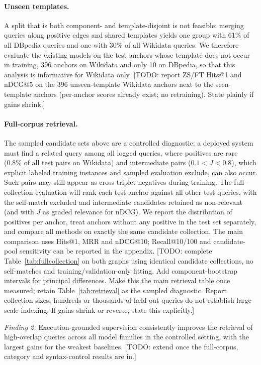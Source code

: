 \documentclass[runningheads]{llncs}
\newcommand{\hp}[1]{{\color{red!75!black}#1}}
\begin{document}
\paragraph{Unseen templates.}
A split that is both component- and template-disjoint is not feasible: merging
queries along positive edges and shared templates yields one group with 61\%
of all DBpedia queries and one with 30\% of all Wikidata queries. We therefore
evaluate the existing models on the test anchors whose template does not occur
in training, 396 anchors on Wikidata and only 10 on DBpedia, so that this
analysis is informative for Wikidata only.
\hp{[TODO: report ZS/FT Hits@1 and nDCG@5 on the 396 unseen-template Wikidata
anchors next to the seen-template anchors (per-anchor scores already exist; no
retraining). State plainly if gains shrink.]}

\paragraph{Full-corpus retrieval.}
The sampled candidate sets above are a controlled diagnostic; a deployed
system must find a related query among all logged queries, where positives are
rare (0.8\% of all test pairs on Wikidata) and intermediate pairs
($0.1 < J < 0.8$), which explicit labeled training instances and sampled
evaluation exclude, can also occur. Such pairs may still appear as
cross-triplet negatives during training. The full-collection evaluation
will rank each test anchor against all other test queries, with the
self-match excluded and intermediate candidates retained as non-relevant (and
with $J$ as graded relevance for nDCG). We report the distribution of
positives per anchor, treat anchors without any positive in the test set
separately, and compare all methods on exactly the same candidate collection.
The main comparison uses Hits@1, MRR and nDCG@10; Recall@10/100 and
candidate-pool sensitivity can be reported in the appendix.
\hp{[TODO: complete Table~\ref{tab:fullcollection} on both graphs using
identical candidate collections, no self-matches and training/validation-only
fitting. Add component-bootstrap intervals for principal differences. Make
this the main retrieval table once measured; retain Table~\ref{tab:retrieval}
as the sampled diagnostic. Report collection sizes; hundreds or thousands
of held-out queries do not establish large-scale indexing. If gains shrink
or reverse, state this explicitly.]}


\textit{Finding 2.} Execution-grounded supervision consistently improves the
retrieval of high-overlap queries across all model families in the controlled
setting, with the largest gains for the weakest baselines.
\hp{[TODO: extend once the full-corpus, category and syntax-control results
are in.]}
\end{document}
